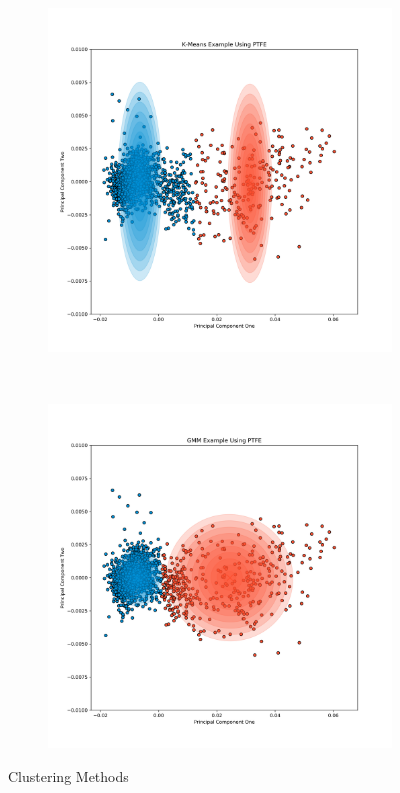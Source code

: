 \documentclass[a4paper,11pt]{article}
\begin{document}
\begin{figure}[t!]
    \centering
    \begin{subfigure}[b]{0.48\textwidth}
        \includegraphics[width=\textwidth]{figures/Kmeans.png}
    \end{subfigure}
    ~ %
    \begin{subfigure}[b]{0.48\textwidth}
        \includegraphics[width=\textwidth]{figures/GMM.png}
    \end{subfigure}

    \caption{Clustering Methods}\label{clustering_methods}
\end{figure}
\end{document}
